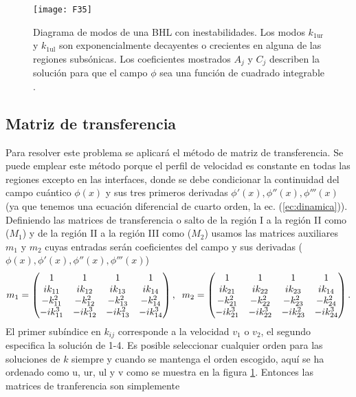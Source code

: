 \begin{figure}\centering
	\texttt{[image: F35]}
	\caption{Diagrama de modos de una BHL con inestabilidades. Los modos $k_{1\text{ur}}$ y $k_{1\text{ul}}$ son exponencialmente decayentes o crecientes en alguna de las regiones subs\'{o}nicas. Los coeficientes mostrados $A_j$ y $C_j$ describen la soluci\'{o}n para que el campo $\phi$ sea una funci\'{o}n de cuadrado integrable \citep{2018Bermudez}.}\label{fig:3.6}
\end{figure}

\subsection{Matriz de transferencia}\label{matriztransferencia}
Para resolver este problema se aplicar\'{a} el método de matriz de transferencia. Se puede emplear este método porque el perfil de velocidad es constante en todas las regiones excepto en las interfaces, donde se debe condicionar la continuidad del campo cuántico $\phi(x)$ y sus tres primeros derivadas $\phi'(x), \phi''(x),\phi'''(x)$ (ya que tenemos una ecuación diferencial de cuarto orden, la ec. (\ref{ec:dinamica})).\\
Definiendo las matrices de transferencia o salto de la región I a la regi\'{o}n II como ($M_1$) y de la regi\'{o}n II a la regi\'{o}n III como ($M_2$) usamos las matrices auxiliares $m_1$ y $m_2$ cuyas entradas ser\'{a}n coeficientes del campo y sus derivadas ($\phi(x),\phi'(x), \phi''(x),\phi'''(x)$)
\begin{eqnarray}
m_1=\begin{pmatrix}
1 & 1 & 1 & 1 \\ 
ik_{11} &ik_{12}  & ik_{13} &ik_{14} \\ 
-k_{11}^2 &- k_{12}^2 &-k_{13}^2  &-k_{14}^2 \\ 
 -ik_{11}^3&  -ik_{12}^3& - ik_{13}^2 & -ik_{14}^3
\end{pmatrix},\hspace{0.2cm}m_2=\begin{pmatrix}
1 & 1 & 1 & 1 \\ 
ik_{21} &ik_{22}  & ik_{23} &ik_{14} \\ 
-k_{21}^2 &- k_{22}^2 &-k_{23}^2  &-k_{24}^2 \\ 
 -ik_{21}^3&  -ik_{22}^3& - ik_{23}^2 & -ik_{24}^3
\end{pmatrix}.
\end{eqnarray} 
El primer sub\'{i}ndice en $k_{ij}$ corresponde a la velocidad $v_1$ o $v_2$, el segundo especifica la soluci\'{o}n de 1-4. Es posible seleccionar cualquier orden para las soluciones de $k$ siempre y cuando se mantenga el orden escogido, aqu\'{i} se ha ordenado como $\text{u}$, $\text{ur}$, $\text{ul}$ y $\text{v}$ como se muestra en la figura \ref{fig:3.6}. Entonces las matrices de tranferencia son simplemente 
